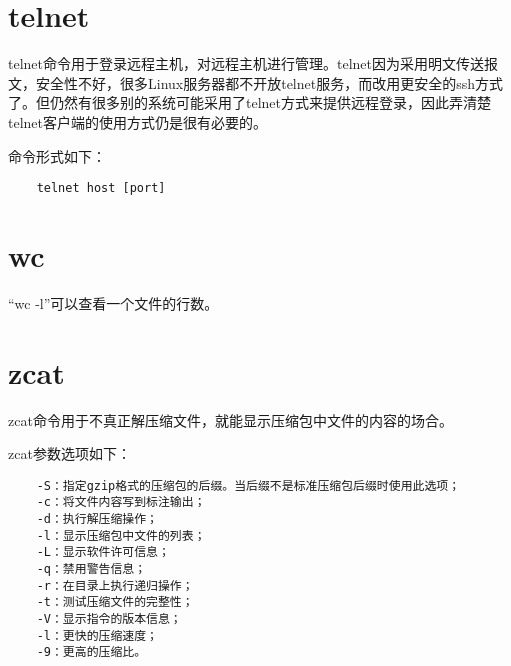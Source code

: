 \documentclass[a4paper,left=2.5cm,right=2.5cm,11pt]{article}
\begin{document}
\section{telnet}
	telnet命令用于登录远程主机，对远程主机进行管理。telnet因为采用明文传送报文，安全性不好，很多Linux服务器都不开放telnet服务，而改用更安全的ssh方式了。但仍然有很多别的系统可能采用了telnet方式来提供远程登录，因此弄清楚telnet客户端的使用方式仍是很有必要的。\par

	命令形式如下：
	\begin{lstlisting}
	telnet host [port]
	\end{lstlisting}

\section{wc}
	“wc -l”可以查看一个文件的行数。

\section{zcat}
	zcat命令用于不真正解压缩文件，就能显示压缩包中文件的内容的场合。\par

	zcat参数选项如下：
	\begin{lstlisting}
	-S：指定gzip格式的压缩包的后缀。当后缀不是标准压缩包后缀时使用此选项； 
	-c：将文件内容写到标注输出； 
	-d：执行解压缩操作； 
	-l：显示压缩包中文件的列表； 
	-L：显示软件许可信息； 
	-q：禁用警告信息； 
	-r：在目录上执行递归操作； 
	-t：测试压缩文件的完整性； 
	-V：显示指令的版本信息； 
	-l：更快的压缩速度； 
	-9：更高的压缩比。
	\end{lstlisting}
\end{document}
